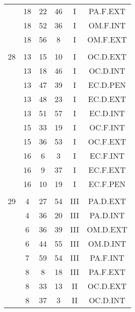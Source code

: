 \documentclass[12pt, a4paper]{article}
\begin{document}
\begin{multicols}{3}
{\begin{tabular}{c c c c c c}
	 	 	 	 & 18 & 22 & 46 & I & PA.F.EXT\\%
	 	 	 	 & 18 & 52 & 36 & I & OM.F.INT\\%
	 	 	 	 & 18 & 56 & 8 & I & OM.F.EXT\\%
	 	 	 	 & & & & & \\%
	 	 	 	28 & 13 & 15 & 10 & I & OC.D.EXT\\%
	 	 	 	 & 13 & 18 & 46 & I & OC.D.INT\\%
	 	 	 	 & 13 & 47 & 39 & I & EC.D.PEN\\%
	 	 	 	 & 13 & 48 & 23 & I & EC.D.EXT\\%
	 	 	 	 & 13 & 51 & 57 & I & EC.D.INT\\%
	 	 	 	 & 15 & 33 & 19 & I & OC.F.INT\\%
	 	 	 	 & 15 & 36 & 53 & I & OC.F.EXT\\%
	 	 	 	 & 16 & 6 & 3 & I & EC.F.INT\\%
	 	 	 	 & 16 & 9 & 37 & I & EC.F.EXT\\%
	 	 	 	 & 16 & 10 & 19 & I & EC.F.PEN\\%
	 	 	 	 & & & & & \\%
	 	 	 	29 & 4 & 27 & 54 & III & PA.D.EXT\\%
	 	 	 	 & 4 & 36 & 20 & III & PA.D.INT\\%
	 	 	 	 & 6 & 36 & 39 & III & OM.D.EXT\\%
	 	 	 	 & 6 & 44 & 55 & III & OM.D.INT\\%
	 	 	 	 & 7 & 59 & 54 & III & PA.F.INT\\%
	 	 	 	 & 8 & 8 & 18 & III & PA.F.EXT\\%
	 	 	 	 & 8 & 33 & 13 & II & OC.D.EXT\\%
	 	 	 	 & 8 & 37 & 3 & II & OC.D.INT\\%

\end{tabular}}
\end{multicols}
\end{document}
